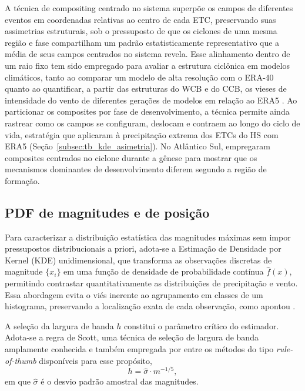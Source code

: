 A técnica de compositing centrado no sistema superpõe os campos de diferentes eventos em coordenadas relativas ao centro de cada ETC, preservando suas assimetrias estruturais, sob o pressuposto de que os ciclones de uma mesma região e fase compartilham um padrão estatisticamente representativo que a média de seus campos centrados no sistema revela.
Esse alinhamento dentro de um raio fixo tem sido empregado para avaliar a estrutura ciclônica em modelos climáticos, tanto ao comparar um modelo de alta resolução com o ERA-40 \citep{catto2010climate} quanto ao quantificar, a partir das estruturas do WCB e do CCB, os vieses de intensidade do vento de diferentes gerações de modelos em relação ao ERA5 \citep{priestley2022improved}.
Ao particionar os composites por fase de desenvolvimento, a técnica permite ainda rastrear como os campos se configuram, deslocam e contraem ao longo do ciclo de vida, estratégia que \citet{mcerlich2023extremes} aplicaram à precipitação extrema dos ETCs do HS com ERA5 (Seção~\ref{subsec:tb_kde_asimetria}).
No Atlântico Sul, \citet{gramcianinov2019properties} empregaram composites centrados no ciclone durante a gênese para mostrar que os mecanismos dominantes de desenvolvimento diferem segundo a região de formação.

\subsection{PDF de magnitudes e de posição}\label{subsec:tb_kde}

Para caracterizar a distribuição estatística das magnitudes máximas sem impor pressupostos distribucionais a priori, adota-se a Estimação de Densidade por Kernel (KDE) unidimensional, que transforma as observações discretas de magnitude $\{x_i\}$ em uma função de densidade de probabilidade contínua $\hat{f}(x)$, permitindo contrastar quantitativamente as distribuições de precipitação e vento.
Essa abordagem evita o viés inerente ao agrupamento em classes de um histograma, preservando a localização exata de cada observação, como apontou \citet{weglarczyk2018kernel}.

A seleção da largura de banda $h$ constitui o parâmetro crítico do estimador. Adota-se a regra
de Scott, uma técnica de seleção de largura de banda amplamente conhecida e também empregada por \citet{weglarczyk2018kernel} entre os métodos do tipo \textit{rule-of-thumb} disponíveis para esse propósito,
\begin{equation}\label{eq:scott_rule}
h = \hat{\sigma} \cdot m^{-1/5},
\end{equation}
em que $\hat{\sigma}$ é o desvio padrão amostral das magnitudes.

